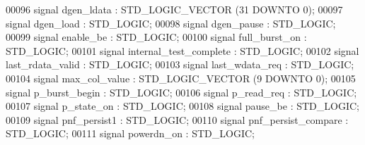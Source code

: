 \begin{DoxyCode}
00096                 \textcolor{keywordflow}{signal} \textcolor{vhdlchar}{dgen_ldata} \textcolor{vhdlchar}{:}  \textcolor{comment}{STD\_LOGIC\_VECTOR} \textcolor{vhdlchar}{(}\textcolor{vhdllogic}{}\textcolor{vhdllogic}{31} \textcolor{keywordflow}{DOWNTO} \textcolor{vhdllogic}{}\textcolor{vhdllogic}{0}\textcolor{vhdlchar}{)};
00097                 \textcolor{keywordflow}{signal} \textcolor{vhdlchar}{dgen_load} \textcolor{vhdlchar}{:}  \textcolor{comment}{STD\_LOGIC};
00098                 \textcolor{keywordflow}{signal} \textcolor{vhdlchar}{dgen_pause} \textcolor{vhdlchar}{:}  \textcolor{comment}{STD\_LOGIC};
00099                 \textcolor{keywordflow}{signal} \textcolor{vhdlchar}{enable_be} \textcolor{vhdlchar}{:}  \textcolor{comment}{STD\_LOGIC};
00100                 \textcolor{keywordflow}{signal} \textcolor{vhdlchar}{full_burst_on} \textcolor{vhdlchar}{:}  \textcolor{comment}{STD\_LOGIC};
00101                 \textcolor{keywordflow}{signal} \textcolor{vhdlchar}{internal_test_complete} \textcolor{vhdlchar}{:}  \textcolor{comment}{STD\_LOGIC};
00102                 \textcolor{keywordflow}{signal} \textcolor{vhdlchar}{last_rdata_valid} \textcolor{vhdlchar}{:}  \textcolor{comment}{STD\_LOGIC};
00103                 \textcolor{keywordflow}{signal} \textcolor{vhdlchar}{last_wdata_req} \textcolor{vhdlchar}{:}  \textcolor{comment}{STD\_LOGIC};
00104                 \textcolor{keywordflow}{signal} \textcolor{vhdlchar}{max_col_value} \textcolor{vhdlchar}{:}  \textcolor{comment}{STD\_LOGIC\_VECTOR} \textcolor{vhdlchar}{(}\textcolor{vhdllogic}{}\textcolor{vhdllogic}{9} \textcolor{keywordflow}{DOWNTO} \textcolor{vhdllogic}{}\textcolor{vhdllogic}{0}\textcolor{vhdlchar}{)};
00105                 \textcolor{keywordflow}{signal} \textcolor{vhdlchar}{p_burst_begin} \textcolor{vhdlchar}{:}  \textcolor{comment}{STD\_LOGIC};
00106                 \textcolor{keywordflow}{signal} \textcolor{vhdlchar}{p_read_req} \textcolor{vhdlchar}{:}  \textcolor{comment}{STD\_LOGIC};
00107                 \textcolor{keywordflow}{signal} \textcolor{vhdlchar}{p_state_on} \textcolor{vhdlchar}{:}  \textcolor{comment}{STD\_LOGIC};
00108                 \textcolor{keywordflow}{signal} \textcolor{vhdlchar}{pause_be} \textcolor{vhdlchar}{:}  \textcolor{comment}{STD\_LOGIC};
00109                 \textcolor{keywordflow}{signal} \textcolor{vhdlchar}{pnf_persist1} \textcolor{vhdlchar}{:}  \textcolor{comment}{STD\_LOGIC};
00110                 \textcolor{keywordflow}{signal} \textcolor{vhdlchar}{pnf_persist_compare} \textcolor{vhdlchar}{:}  \textcolor{comment}{STD\_LOGIC};
00111                 \textcolor{keywordflow}{signal} \textcolor{vhdlchar}{powerdn_on} \textcolor{vhdlchar}{:}  \textcolor{comment}{STD\_LOGIC};

\end{DoxyCode}
